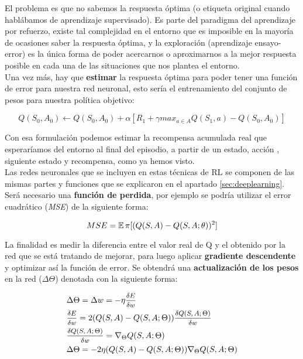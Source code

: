 \documentclass[11pt,fleqn]{book} %
\begin{document}
El problema es que no sabemos la respuesta óptima (o etiqueta original cuando hablábamos de aprendizaje supervisado). Es parte del paradigma del aprendizaje por refuerzo, existe tal complejidad en el entorno que es imposible en la mayoría de ocasiones saber la respuesta óptima, y la exploración (aprendizaje ensayo-error) es la única forma de poder acercarnos o aproximarnos a la mejor respuesta posible en cada una de las situaciones que nos plantea el entorno. \\

Una vez más, hay que \textbf{estimar} la respuesta óptima para poder tener una función de error para nuestra red neuronal, esto sería el entrenamiento del conjunto de pesos para nuestra política objetivo:

\begin{equation}
Q(S_0,A_0) \leftarrow Q(S_0,A_0) + \alpha \left[R_1+\gamma max_{a\in A}Q(S_1,a)-Q(S_0,A_0)\right]
\end{equation}

Con esa formulación podemos estimar la recompensa acumulada real que esperaríamos del entorno al final del episodio, a partir de un estado, acción , siguiente estado y recompensa, como ya hemos visto. \\

Las redes neuronales que se incluyen en estas técnicas de RL se componen de las mismas partes y funciones que se explicaron en el apartado \ref{sec:deeplearning}. Será necesario una \textbf{función de perdida}, por ejemplo se podría utilizar el error cuadrático (\textit{MSE}) de la siguiente forma:

\begin{equation}
MSE= \operatorname*{\mathbb{E}}\pi[(Q(S,A)-Q(S,A;\theta))^2]
\end{equation}

La finalidad es medir la diferencia entre el valor real de Q y el obtenido por la red que se está tratando de mejorar, para luego aplicar \textbf{gradiente descendente} y optimizar así la función de error. Se obtendrá una \textbf{actualización de los pesos} en la red ($\Delta\Theta$) denotada con la siguiente forma:

\begin{align}
\begin{split}
&\Delta\Theta = \Delta w = -\eta \mfrac{\delta E}{\delta w} \\
&\mfrac{\delta E}{\delta w} = 2(Q(S,A)-Q(S,A;\Theta))\mfrac{\delta Q(S,A;\Theta)}{\delta w}\\
&\mfrac{\delta Q(S,A;\Theta)}{\delta w}=\nabla_\Theta Q(S,A;\Theta) \\
&\Delta\Theta=-2\eta(Q(S,A)-Q(S,A;\Theta))\nabla_\Theta Q(S,A;\Theta)
\end{split} 
\end{align}
\end{document}
